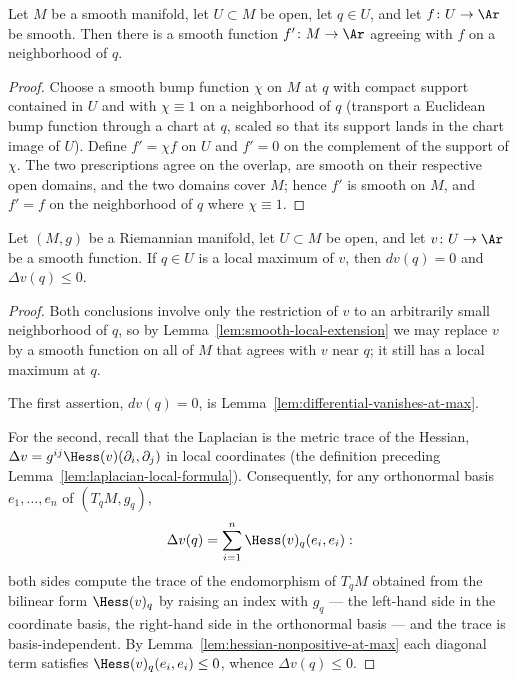 \begin{lemma}
\label{lem:smooth-local-extension}
\leanok
Let $M$ be a smooth manifold, let $U\subset M$ be open, let $q\in U$,
and let $f\colon U\to\Ar$ be smooth. Then there is a smooth function
$f'\colon M\to\Ar$ agreeing with $f$ on a neighborhood of $q$.
\end{lemma}

\begin{proof}
\leanok
Choose a smooth bump function $\chi$ on $M$ at $q$ with compact
support contained in $U$ and with $\chi\equiv1$ on a neighborhood of
$q$ (transport a Euclidean bump function through a chart at $q$,
scaled so that its support lands in the chart image of $U$). Define
$f'=\chi f$ on $U$ and $f'=0$ on the complement of the support of
$\chi$. The two prescriptions agree on the overlap, are smooth on
their respective open domains, and the two domains cover $M$; hence
$f'$ is smooth on $M$, and $f'=f$ on the neighborhood of $q$ where
$\chi\equiv1$.
\end{proof}

\begin{lemma}
\label{lem:laplacian-nonpositive-at-max}
\leanok
{}
Let $(M,g)$ be a Riemannian manifold, let $U\subset M$ be open, and
let $v\colon U\to \Ar$ be a smooth function. If $q\in U$ is a local
maximum of $v$, then $dv(q)=0$ and $\Delta v(q)\le 0$.
\end{lemma}

\begin{proof}
\leanok
{}
Both conclusions involve only the restriction of $v$ to an arbitrarily
small neighborhood of $q$, so by Lemma~\ref{lem:smooth-local-extension}
we may replace $v$ by a smooth function on all of $M$ that agrees with
$v$ near $q$; it still has a local maximum at $q$.

The first assertion, $dv(q)=0$, is
Lemma~\ref{lem:differential-vanishes-at-max}.

For the second, recall that the Laplacian is the metric trace of the
Hessian, $\Delta v=g^{ij}\Hess(v)(\partial_i,\partial_j)$ in local
coordinates (the definition preceding
Lemma~\ref{lem:laplacian-local-formula}). Consequently, for any
orthonormal basis $e_1,\dots,e_n$ of $(T_qM,g_q)$,
$$\Delta v(q)=\sum_{i=1}^n\Hess(v)_q(e_i,e_i):$$
both sides compute the trace of the endomorphism of $T_qM$ obtained
from the bilinear form $\Hess(v)_q$ by raising an index with $g_q$
--- the left-hand side in the coordinate basis, the right-hand side in
the orthonormal basis --- and the trace is basis-independent. By
Lemma~\ref{lem:hessian-nonpositive-at-max} each diagonal term
satisfies $\Hess(v)_q(e_i,e_i)\le0$, whence $\Delta v(q)\le0$.
\end{proof}

